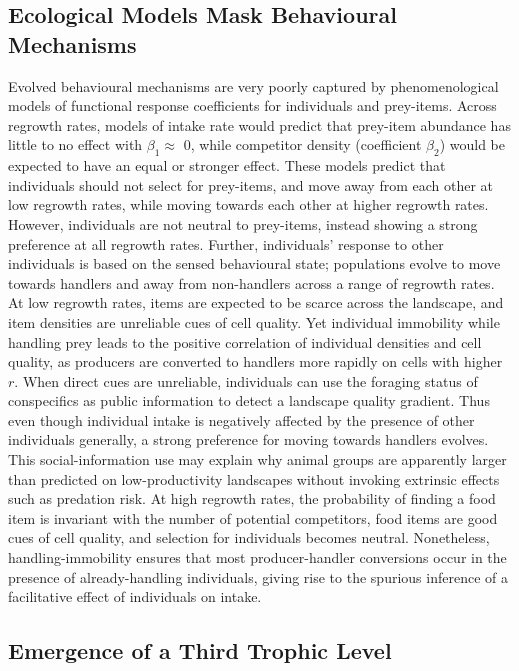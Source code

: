 \documentclass[11pt]{article}
\begin{document}
\subsection*{Ecological Models Mask Behavioural Mechanisms}

Evolved behavioural mechanisms are very poorly captured by phenomenological models of functional response coefficients for individuals and prey-items.
Across regrowth rates, models of intake rate would predict that prey-item abundance has little to no effect with $\beta_1 \approx$ 0, while competitor density (coefficient $\beta_2$) would be expected to have an equal or stronger effect.
These models predict that individuals should not select for prey-items, and move away from each other at low regrowth rates, while moving towards each other at higher regrowth rates.
However, individuals are not neutral to prey-items, instead showing a strong preference at all regrowth rates.
Further, individuals' response to other individuals is based on the sensed behavioural state; populations evolve to move towards handlers and away from non-handlers across a range of regrowth rates.
At low regrowth rates, items are expected to be scarce across the landscape, and item densities are unreliable cues of cell quality.
Yet individual immobility while handling prey leads to the positive correlation of individual densities and cell quality, as producers are converted to handlers more rapidly on cells with higher $r$.
When direct cues are unreliable, individuals can use the foraging status of conspecifics as public information to detect a landscape quality gradient.
Thus even though individual intake is negatively affected by the presence of other individuals generally, a strong preference for moving towards handlers evolves.
This social-information use may explain why animal groups are apparently larger than predicted on low-productivity landscapes without invoking extrinsic effects such as predation risk.
At high regrowth rates, the probability of finding a food item is invariant with the number of potential competitors, food items are good cues of cell quality, and selection for individuals becomes neutral.
Nonetheless, handling-immobility ensures that most producer-handler conversions occur in the presence of already-handling individuals, giving rise to the spurious inference of a facilitative effect of individuals on intake.

\subsection*{Emergence of a Third Trophic Level}
\end{document}
